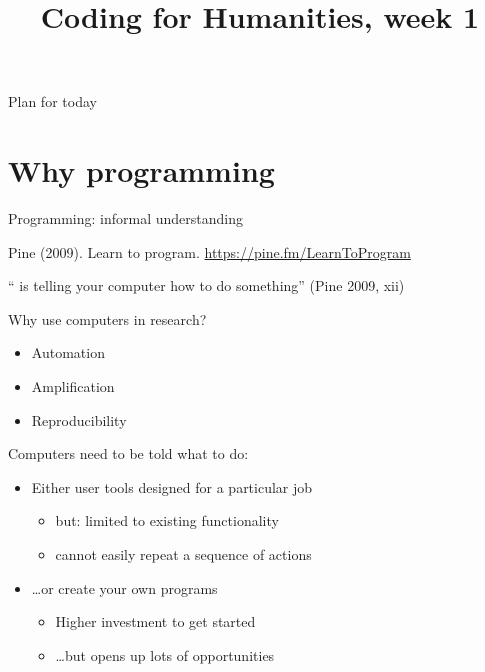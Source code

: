 \documentclass[aspectratio=169,usenames,dvipsnames]{beamer}
\title{Coding for Humanities, week 1}
\begin{document}
\begin{frame}
 \titlepage
\end{frame}

\begin{frame}{Plan for today}
 \tableofcontents
\end{frame}




\section{Why programming}
\frame{\tableofcontents[currentsection]}
\begin{frame}{Programming: informal understanding}
    \begin{reference}
        Pine (2009). Learn to program. \url{https://pine.fm/LearnToProgram}
    \end{reference}
    \begin{definition}
        `` is telling your computer
        how to do something'' (Pine 2009, xii)
    \end{definition}
\end{frame}

\begin{frame}
    Why use computers in research?
	\pause

    \begin{itemize}
        \item Automation
        \item Amplification
        \item Reproducibility
    \end{itemize}

    \pause
    Computers need to be told what to do:

    \begin{itemize}
    \item Either user tools designed for a particular job
        \begin{itemize}
            \item but: limited to existing functionality
            \item cannot easily repeat a sequence of actions
        \end{itemize}

    \item \dots or create your own programs
        \begin{itemize}
            \item Higher investment to get started
            \item \dots but opens up lots of opportunities
        \end{itemize}
    \end{itemize}
\end{frame}
\end{document}
